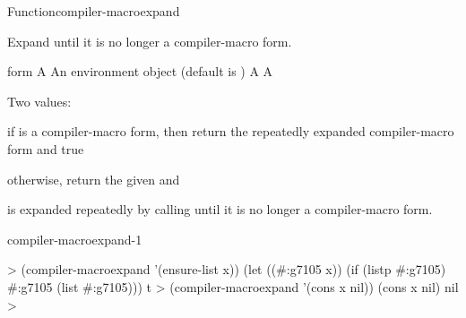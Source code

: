 \documentclass[10pt,twoside,english,pdftex]{article}
\begin{document}
\begin{functiondoc}{Function}{compiler-macroexpand}{ 
    }
%
%
  
\fnsyntax

\fnpurpose Expand  until it is no longer a compiler-macro form.

\fnpackage {}

\fnmodule {}

\fnargs
\begin{args}{form}
\arg[form] A 
\arg[env] An environment object (default is \nil)
\arg[expansion] A 
\arg[expanded-p] A 
\end{args}

\fnreturns
Two values:
\begin{tightitemize}
\item if  is a compiler-macro form, then return the 
  repeatedly expanded compiler-macro form and true
\item otherwise, return the given  and \nil{}
\end{tightitemize}

\fndescription
%
 is expanded repeatedly by calling
 until it is no longer a
compiler-macro form.

\begin{alsos}{compiler-macroexpand-1}
\end{alsos}

\fnexamples
%
\W\supp
\begin{example}
  > (compiler-macroexpand '(ensure-list x))
  (let ((#:g7105 x)) (if (listp #:g7105) #:g7105 (list #:g7105)))
  t
  > (compiler-macroexpand '(cons x nil))
  (cons x nil)
  nil
  >
\end{example}

\end{functiondoc}

\end{document}
